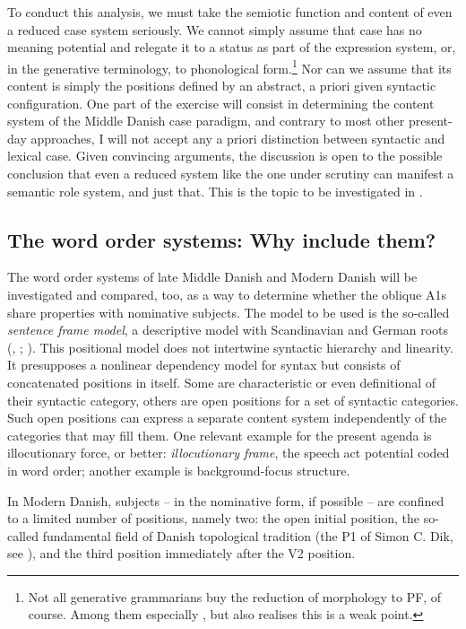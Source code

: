 \documentclass[output=paper]{langscibook}
\begin{document}
To conduct this analysis, we must take the semiotic function and content of even a reduced case system seriously. We cannot simply assume that case has no meaning potential and relegate it to a status as part of the expression system, or, in the generative terminology, to phonological form.\footnote{Not all generative grammarians buy the reduction of morphology to PF, of course. Among them especially \citet{Kiparsky1997}, but also \citet{Sigurðsson2006, Sigurðsson2012, Sigurðsson2012b} realises this is a weak point.}  Nor can we assume that its content is simply the positions defined by an abstract, a priori given syntactic configuration.  One part of the exercise will consist in determining the content system of the Middle Danish case paradigm, and contrary to most other present-day approaches, I will not accept any a priori distinction between syntactic and lexical case. Given convincing arguments, the discussion is open to the possible conclusion that even a reduced system like the one under scrutiny can manifest a semantic role system, and just that. This is the topic to be investigated in .

\subsection{The word order systems: Why include them?} \label{heltoft:1.2}

The word order systems of  late Middle Danish and Modern Danish will be investigated and compared, too, as a way to determine whether the oblique A1s share properties with nominative subjects. The model to be used is the so-called \textit{sentence frame model}, a descriptive model with Scandinavian and German roots (\citealt{Diderichsen1946}, \citealt{Faarlund1989, Faarlund1990, Faarlund1997}; \citealt{Heltoft1992}). This positional model does not intertwine syntactic hierarchy and linearity. It presupposes a nonlinear dependency model for syntax but consists of concatenated positions in itself. Some are characteristic or even definitional \citep{Melčuk2014} of their syntactic category, others are open positions for a set of syntactic categories. Such open positions can express a separate content system independently of the categories that may fill them. One relevant example for the present agenda is illocutionary force, or better: \textit{illocutionary frame}, the speech act potential coded in word order; another example is background-focus structure. 

 In Modern Danish, subjects – in the nominative form, if possible – are confined to a limited number of  positions, namely two: the open initial position, the so-called fundamental field of Danish topological tradition (the P1 of Simon C. Dik, see \citealt[408--416]{Dik1997}), and the third position immediately after the V2 position.
\end{document}

